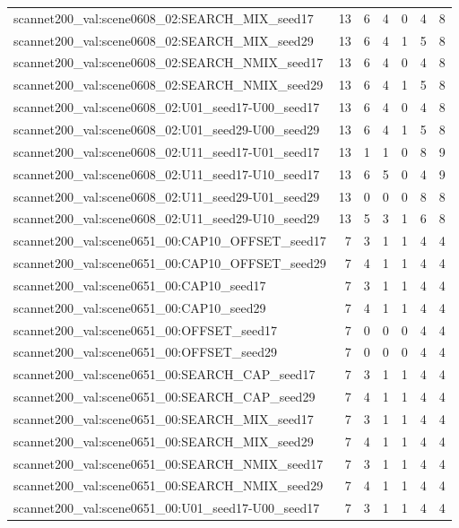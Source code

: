 \begin{table}[t]
\begin{tabular}{lrrrrrr}
scannet200\_val:scene0608\_02:SEARCH\_MIX\_seed17 & 13 & 6 & 4 & 0 & 4 & 8 \\
scannet200\_val:scene0608\_02:SEARCH\_MIX\_seed29 & 13 & 6 & 4 & 1 & 5 & 8 \\
scannet200\_val:scene0608\_02:SEARCH\_NMIX\_seed17 & 13 & 6 & 4 & 0 & 4 & 8 \\
scannet200\_val:scene0608\_02:SEARCH\_NMIX\_seed29 & 13 & 6 & 4 & 1 & 5 & 8 \\
scannet200\_val:scene0608\_02:U01\_seed17-U00\_seed17 & 13 & 6 & 4 & 0 & 4 & 8 \\
scannet200\_val:scene0608\_02:U01\_seed29-U00\_seed29 & 13 & 6 & 4 & 1 & 5 & 8 \\
scannet200\_val:scene0608\_02:U11\_seed17-U01\_seed17 & 13 & 1 & 1 & 0 & 8 & 9 \\
scannet200\_val:scene0608\_02:U11\_seed17-U10\_seed17 & 13 & 6 & 5 & 0 & 4 & 9 \\
scannet200\_val:scene0608\_02:U11\_seed29-U01\_seed29 & 13 & 0 & 0 & 0 & 8 & 8 \\
scannet200\_val:scene0608\_02:U11\_seed29-U10\_seed29 & 13 & 5 & 3 & 1 & 6 & 8 \\
scannet200\_val:scene0651\_00:CAP10\_OFFSET\_seed17 & 7 & 3 & 1 & 1 & 4 & 4 \\
scannet200\_val:scene0651\_00:CAP10\_OFFSET\_seed29 & 7 & 4 & 1 & 1 & 4 & 4 \\
scannet200\_val:scene0651\_00:CAP10\_seed17 & 7 & 3 & 1 & 1 & 4 & 4 \\
scannet200\_val:scene0651\_00:CAP10\_seed29 & 7 & 4 & 1 & 1 & 4 & 4 \\
scannet200\_val:scene0651\_00:OFFSET\_seed17 & 7 & 0 & 0 & 0 & 4 & 4 \\
scannet200\_val:scene0651\_00:OFFSET\_seed29 & 7 & 0 & 0 & 0 & 4 & 4 \\
scannet200\_val:scene0651\_00:SEARCH\_CAP\_seed17 & 7 & 3 & 1 & 1 & 4 & 4 \\
scannet200\_val:scene0651\_00:SEARCH\_CAP\_seed29 & 7 & 4 & 1 & 1 & 4 & 4 \\
scannet200\_val:scene0651\_00:SEARCH\_MIX\_seed17 & 7 & 3 & 1 & 1 & 4 & 4 \\
scannet200\_val:scene0651\_00:SEARCH\_MIX\_seed29 & 7 & 4 & 1 & 1 & 4 & 4 \\
scannet200\_val:scene0651\_00:SEARCH\_NMIX\_seed17 & 7 & 3 & 1 & 1 & 4 & 4 \\
scannet200\_val:scene0651\_00:SEARCH\_NMIX\_seed29 & 7 & 4 & 1 & 1 & 4 & 4 \\
scannet200\_val:scene0651\_00:U01\_seed17-U00\_seed17 & 7 & 3 & 1 & 1 & 4 & 4 \\

\end{tabular}
\end{table}
